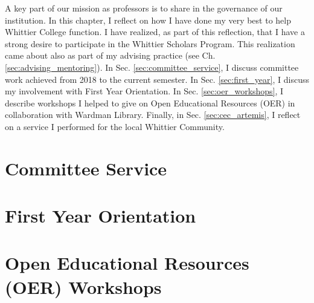 \documentclass[../../main.tex]{subfiles}
\begin{document}
\label{sec:service}

A key part of our mission as professors is to share in the governance of our institution.  In this chapter, I reflect on how I have done my very best to help Whittier College function.  I have realized, as part of this reflection, that I have a strong desire to participate in the Whittier Scholars Program.  This realization came about also as part of my advising practice (see Ch. \ref{sec:advising_mentoring}).  In Sec. \ref{sec:committee_service}, I discuss committee work achieved from 2018 to the current semester.  In Sec. \ref{sec:first_year}, I discuss my involvement with First Year Orientation.  In Sec. \ref{sec:oer_workshops}, I describe workshops I helped to give on Open Educational Resources (OER) in collaboration with Wardman Library.  Finally, in Sec. \ref{sec:cec_artemis}, I reflect on a service I performed for the local Whittier Community.

\section{Committee Service}

%

\begin{flushleft}

\end{flushleft}

\section{First Year Orientation}

%

\begin{flushleft}

\end{flushleft}

\section{Open Educational Resources (OER) Workshops}

%
\end{document}
